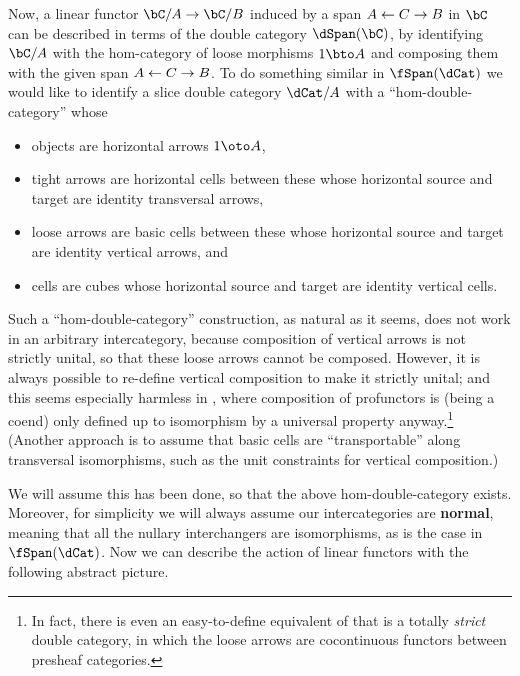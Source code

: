 \documentclass{amsart}
\begin{document}
Now, a linear functor $\bC/A\to \bC/B$ induced by a span $A \leftarrow C \to B$ in $\bC$ can be described in terms of the double category $\dSpan(\bC)$, by identifying $\bC/A$ with the hom-category of loose morphisms $1\bto A$ and composing them with the given span $A \leftarrow C \to B$.
To do something similar in $\fSpan(\dCat)$ we would like to identify a slice double category $\dCat/A$ with a ``hom-double-category'' whose
\begin{itemize}
\item objects are horizontal arrows $1\oto A$,
\item tight arrows are horizontal cells between these whose horizontal source and target are identity transversal arrows,
\item loose arrows are basic cells between these whose horizontal source and target are identity vertical arrows, and
\item cells are cubes whose horizontal source and target are identity vertical cells.
\end{itemize}
Such a ``hom-double-category'' construction, as natural as it seems, does not work in an arbitrary intercategory, because composition of vertical arrows is not strictly unital, so that these loose arrows cannot be composed.
However, it is always possible to re-define vertical composition to make it strictly unital; and this seems especially harmless in \dCat, where composition of profunctors is (being a coend) only defined up to isomorphism by a universal property anyway.\footnote{In fact, there is even an easy-to-define equivalent of \dCat that is a totally \emph{strict} double category, in which the loose arrows are cocontinuous functors between presheaf categories.}
(Another approach is to assume that basic cells are ``transportable'' along transversal isomorphisms, such as the unit constraints for vertical composition.)

We will assume this has been done, so that the above hom-double-category exists.
Moreover, for simplicity we will always assume our intercategories are \textbf{normal}, meaning that all the nullary interchangers are isomorphisms, as is the case in $\fSpan(\dCat)$.
Now we can describe the action of linear functors with the following abstract picture.
\end{document}

